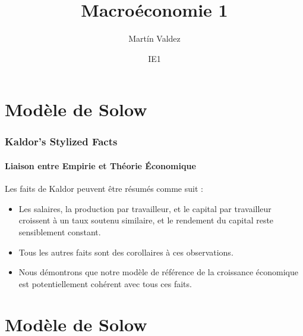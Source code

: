 \documentclass{beamer}
\title{Macroéconomie 1}
\author{Mart\'in Valdez}
\date{IE1}
\begin{document}
\begin{frame}
\titlepage
\end{frame}


\section{Modèle de Solow}
\begin{frame}
    \frametitle{Kaldor's Stylized Facts}
    \framesubtitle{Liaison entre Empirie et Théorie Économique}
    \hypertarget{kaldor_summary}{} %
    Les faits de Kaldor peuvent être résumés comme suit :
    \begin{itemize}
        \item  Les salaires, la production par travailleur, et le capital par travailleur 
        croissent à un taux soutenu similaire, et le rendement du capital reste sensiblement constant.
        \pause
        \item Tous les autres faits sont des corollaires à ces observations.
        \pause
        \item Nous démontrons que notre modèle de référence de la croissance économique
        est potentiellement cohérent avec tous ces faits.
    \end{itemize}
\end{frame}
\section{Modèle de Solow}
\end{document}
